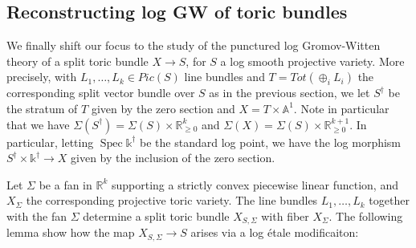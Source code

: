 \documentclass[12pt, oneside]{amsart}   	%
\newcommand{\kk}{\mathds{k}}
\newcommand{\Spec}{\operatorname{Spec}}
\numberwithin{equation}{section}
\numberwithin{thm}{section}
\numberwithin{figure}{section}
\begin{document}
%
%
%
%


\subsection{Reconstructing log GW of toric bundles}

We finally shift our focus to the study of the punctured log Gromov-Witten theory of a split toric bundle $X \rightarrow S$, for $S$ a log smooth projective variety. More precisely, with $L_1,\ldots,L_k \in Pic(S)$ line bundles and $T = Tot(\oplus_i L_i)$ the corresponding split vector bundle over $S$ as in the previous section, we let $S^\dagger$ be the stratum of $T$ given by the zero section and $ X = T \times \mathbb{A}^1$. Note in particular that we have $\Sigma(S^\dagger) = \Sigma(S) \times \mathbb{R}_{\ge 0}^{k}$ and $\Sigma(X) = \Sigma(S) \times \mathbb{R}_{\ge 0}^{k+1}$. In particular, letting $\Spec \kk^{\dagger}$ be the standard log point, we have the log morphism $S^{\dagger}\times \kk^{\dagger} \rightarrow X$ given by the inclusion of the zero section. 

Let $\Sigma$ be a fan in $\mathbb{R}^k$ supporting a strictly convex piecewise linear function, and $X_\Sigma$ the corresponding projective toric variety. The line bundles $L_1,\ldots,L_k$ together with the fan $\Sigma$ determine a split toric bundle $X_{S,\Sigma}$ with fiber $X_{\Sigma}$. The following lemma show how the map $X_{S,\Sigma} \rightarrow S$ arises via a log \'etale modificaiton:
\end{document}
